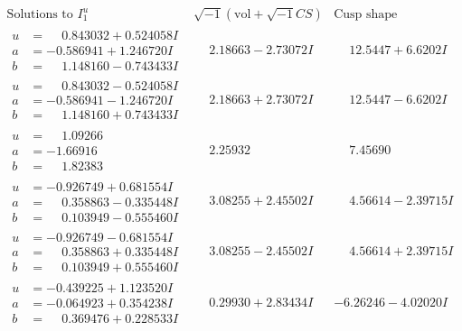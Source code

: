 \documentclass[1p]{elsarticle_modified}
\theoremstyle{definition}
\newcommand{\I}{\sqrt{-1}}
\begin{document}
$$\begin{array}{c|c|c}  
\text{Solutions to }I^u_{1}& \I (\text{vol} + \sqrt{-1}CS) & \text{Cusp shape}\\
 \hline 
\begin{aligned}
u &= \phantom{-}0.843032 + 0.524058 I \\
a &= -0.586941 + 1.246720 I \\
b &= \phantom{-}1.148160 - 0.743433 I\end{aligned}
 & \phantom{-}2.18663 - 2.73072 I & \phantom{-}12.5447 + 6.6202 I \\ \hline\begin{aligned}
u &= \phantom{-}0.843032 - 0.524058 I \\
a &= -0.586941 - 1.246720 I \\
b &= \phantom{-}1.148160 + 0.743433 I\end{aligned}
 & \phantom{-}2.18663 + 2.73072 I & \phantom{-}12.5447 - 6.6202 I \\ \hline\begin{aligned}
u &= \phantom{-}1.09266\phantom{ +0.000000I} \\
a &= -1.66916\phantom{ +0.000000I} \\
b &= \phantom{-}1.82383\phantom{ +0.000000I}\end{aligned}
 & \phantom{-}2.25932\phantom{ +0.000000I} & \phantom{-}7.45690\phantom{ +0.000000I} \\ \hline\begin{aligned}
u &= -0.926749 + 0.681554 I \\
a &= \phantom{-}0.358863 - 0.335448 I \\
b &= \phantom{-}0.103949 - 0.555460 I\end{aligned}
 & \phantom{-}3.08255 + 2.45502 I & \phantom{-}4.56614 - 2.39715 I \\ \hline\begin{aligned}
u &= -0.926749 - 0.681554 I \\
a &= \phantom{-}0.358863 + 0.335448 I \\
b &= \phantom{-}0.103949 + 0.555460 I\end{aligned}
 & \phantom{-}3.08255 - 2.45502 I & \phantom{-}4.56614 + 2.39715 I \\ \hline\begin{aligned}
u &= -0.439225 + 1.123520 I \\
a &= -0.064923 + 0.354238 I \\
b &= \phantom{-}0.369476 + 0.228533 I\end{aligned}
 & \phantom{-}0.29930 + 2.83434 I & -6.26246 - 4.02020 I \\ \hline\begin{aligned}

\end{aligned}
\end{array}$$
\end{document}
